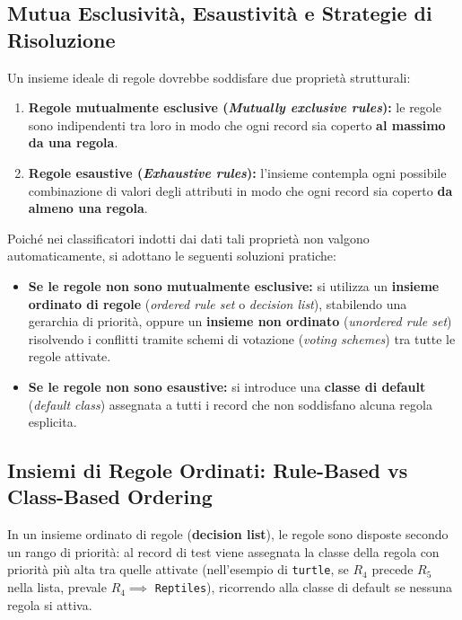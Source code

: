 \FloatBarrier
\subsection{Mutua Esclusivit\`a, Esaustivit\`a e Strategie di Risoluzione}
\label{subsec:dm-rule-properties}

Un insieme ideale di regole dovrebbe soddisfare due propriet\`a strutturali:
\begin{enumerate}
    \item \textbf{Regole mutualmente esclusive (\textit{Mutually exclusive rules}):} le regole sono indipendenti tra loro in modo che ogni record sia coperto \textbf{al massimo da una regola}.
    \item \textbf{Regole esaustive (\textit{Exhaustive rules}):} l'insieme contempla ogni possibile combinazione di valori degli attributi in modo che ogni record sia coperto \textbf{da almeno una regola}.
\end{enumerate}

Poich\'e nei classificatori indotti dai dati tali propriet\`a non valgono automaticamente, si adottano le seguenti soluzioni pratiche:
\begin{itemize}
    \item \textbf{Se le regole non sono mutualmente esclusive:} si utilizza un \textbf{insieme ordinato di regole} (\textit{ordered rule set} o \textit{decision list}), stabilendo una gerarchia di priorit\`a, oppure un \textbf{insieme non ordinato} (\textit{unordered rule set}) risolvendo i conflitti tramite schemi di votazione (\textit{voting schemes}) tra tutte le regole attivate.
    \item \textbf{Se le regole non sono esaustive:} si introduce una \textbf{classe di default} (\textit{default class}) assegnata a tutti i record che non soddisfano alcuna regola esplicita.
\end{itemize}

\FloatBarrier
\subsection{Insiemi di Regole Ordinati: Rule-Based vs Class-Based Ordering}
\label{subsec:dm-rule-ordering}

In un insieme ordinato di regole (\textbf{decision list}), le regole sono disposte secondo un rango di priorit\`a: al record di test viene assegnata la classe della regola con priorit\`a pi\`u alta tra quelle attivate (nell'esempio di \texttt{turtle}, se $R_4$ precede $R_5$ nella lista, prevale $R_4 \implies$ \texttt{Reptiles}), ricorrendo alla classe di default se nessuna regola si attiva.

